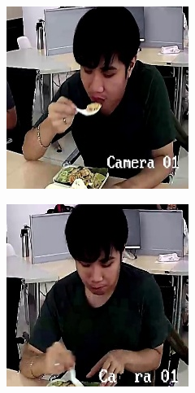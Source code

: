 \begin{figure}[!ht]
\begin{subfigure}[b]{0.45\linewidth}
    \end{subfigure}
    \begin{subfigure}[b]{0.45\linewidth}
      \includegraphics[width=\linewidth]{appendix/eat/001_CXS1_D0_001176.jpg}
    \end{subfigure}
    \begin{subfigure}[b]{0.45\linewidth}
      \includegraphics[width=\linewidth]{appendix/eat/001_CXS1_D0_001318.jpg}

\end{subfigure}
\end{figure}
